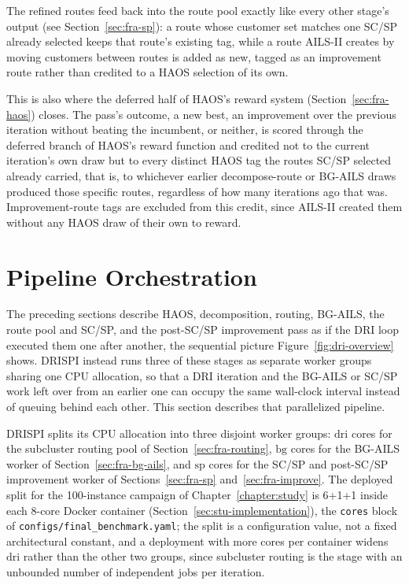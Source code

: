 The refined routes feed back into the route pool exactly like every other stage's output (see Section~\ref{sec:fra-sp}): a route whose customer set matches one SC/SP already selected keeps that route's existing tag, while a route AILS-II creates by moving customers between routes is added as new, tagged as an improvement route rather than credited to a HAOS selection of its own.

This is also where the deferred half of HAOS's reward system (Section~\ref{sec:fra-haos}) closes. The pass's outcome, a new best, an improvement over the previous iteration without beating the incumbent, or neither, is scored through the deferred branch of HAOS's reward function and credited not to the current iteration's own draw but to every distinct HAOS tag the routes SC/SP selected already carried, that is, to whichever earlier decompose-route or BG-AILS draws produced those specific routes, regardless of how many iterations ago that was. Improvement-route tags are excluded from this credit, since AILS-II created them without any HAOS draw of their own to reward.

\section{Pipeline Orchestration}\label{sec:fra-pipeline}
The preceding sections describe HAOS, decomposition, routing, BG-AILS, the route pool and SC/SP, and the post-SC/SP improvement pass as if the DRI loop executed them one after another, the sequential picture Figure~\ref{fig:dri-overview} shows. DRISPI instead runs three of these stages as separate worker groups sharing one CPU allocation, so that a DRI iteration and the BG-AILS or SC/SP work left over from an earlier one can occupy the same wall-clock interval instead of queuing behind each other. This section describes that parallelized pipeline.

DRISPI splits its CPU allocation into three disjoint worker groups: $\mathrm{dri}$ cores for the subcluster routing pool of Section~\ref{sec:fra-routing}, $\mathrm{bg}$ cores for the BG-AILS worker of Section~\ref{sec:fra-bg-ails}, and $\mathrm{sp}$ cores for the SC/SP and post-SC/SP improvement worker of Sections~\ref{sec:fra-sp} and~\ref{sec:fra-improve}. The deployed split for the 100-instance campaign of Chapter~\ref{chapter:study} is 6+1+1 inside each 8-core Docker container (Section~\ref{sec:stu-implementation}), the \texttt{cores} block of \texttt{configs/final\_benchmark.yaml}; the split is a configuration value, not a fixed architectural constant, and a deployment with more cores per container widens $\mathrm{dri}$ rather than the other two groups, since subcluster routing is the stage with an unbounded number of independent jobs per iteration.

